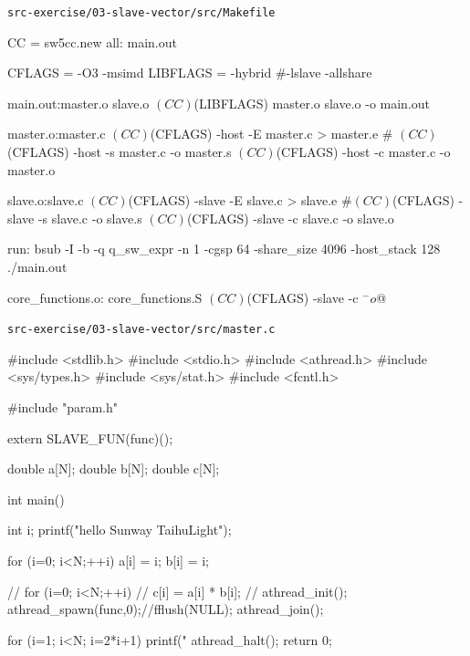 \verb`src-exercise/03-slave-vector/src/Makefile`
\begin{code}
CC = sw5cc.new
all: main.out

CFLAGS = -O3 -msimd
LIBFLAGS = -hybrid #-lslave -allshare

main.out:master.o slave.o
	$(CC) $(LIBFLAGS) master.o slave.o -o main.out

master.o:master.c
	$(CC) $(CFLAGS) -host -E master.c > master.e
	#	$(CC) $(CFLAGS) -host -s master.c -o master.s
	$(CC) $(CFLAGS) -host -c master.c -o master.o

slave.o:slave.c
	$(CC) $(CFLAGS) -slave -E slave.c > slave.e
	#$(CC) $(CFLAGS) -slave -s slave.c -o slave.s
	$(CC) $(CFLAGS) -slave -c slave.c -o slave.o

run:
	bsub -I -b -q q_sw_expr -n 1 -cgsp 64 -share_size 4096 -host_stack 128 ./main.out

core_functions.o: core_functions.S
	$(CC) $(CFLAGS) -slave -c $^ -o $@

\end{code}

\verb`src-exercise/03-slave-vector/src/master.c`
\begin{code}
#include <stdlib.h>
#include <stdio.h>
#include <athread.h>
#include <sys/types.h>
#include <sys/stat.h>
#include <fcntl.h>

#include "param.h"

extern SLAVE_FUN(func)();

double a[N];
double b[N];
double c[N];

int main() {
  int i;
  printf("hello Sunway TaihuLight\n");

  for (i=0; i<N;++i){
    a[i] = i;
    b[i] = i;
  }

  // for (i=0; i<N;++i){
  //   c[i] = a[i] * b[i];
  // }
  athread_init();
  athread_spawn(func,0);//fflush(NULL);
  athread_join();

  for (i=1; i<N; i=2*i+1){
    printf("%
  }
  athread_halt();
  return 0;
}

\end{code}

